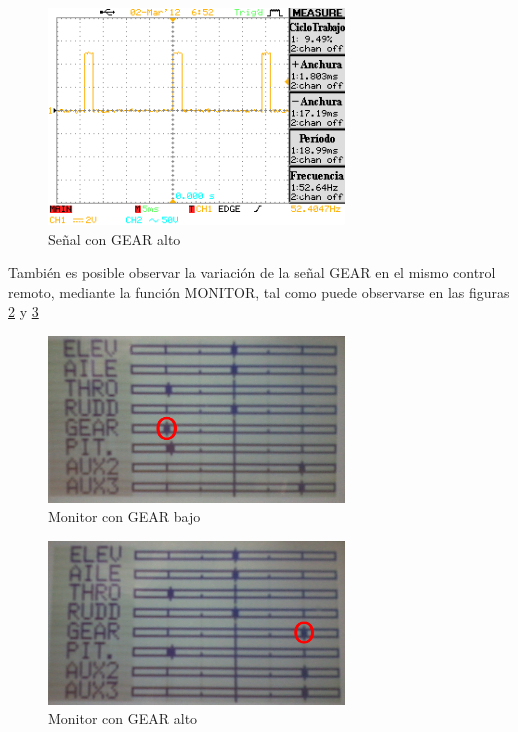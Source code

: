 \documentclass[main]{subfiles}
\begin{document}
\begin{figure}[H]
\begin{center}
\includegraphics[width=0.7\textwidth]{./pics_switcheo/GEAR_alto.png}
\caption{Señal con GEAR alto}
\label{fig:GEAR_alto}
\end{center}
\end{figure}

También es posible observar la variación de la señal GEAR en el mismo control remoto, mediante la función MONITOR, tal como puede observarse en las figuras \ref{fig:control_bajo} y \ref{fig:control_alto}

\begin{figure}[H]
\begin{center}
\includegraphics[width=0.7\textwidth]{./pics_switcheo/control_bajo.png}
\caption{Monitor con GEAR bajo}
\label{fig:control_bajo}
\end{center}
\end{figure}

\begin{figure}[H]
\begin{center}
\includegraphics[width=0.7\textwidth]{./pics_switcheo/control_alto.png}
\caption{Monitor con GEAR alto}
\label{fig:control_alto}
\end{center}
\end{figure}
\end{document}
